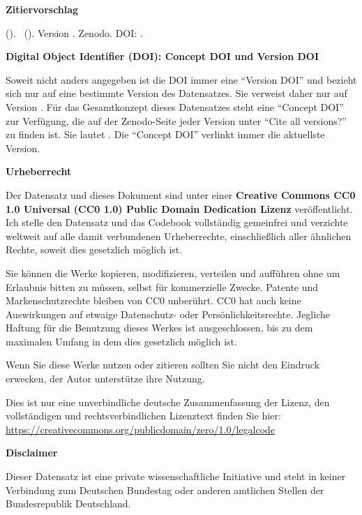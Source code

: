 \textbf{Zitiervorschlag}

\emph{\dataauthor} (\the\year ). \datatitle\ (\datashort ). Version \version . Zenodo. DOI: \dataversiondoi .



\vspace{0.5cm}


\textbf{Digital Object Identifier (DOI): Concept DOI und Version DOI}

Soweit nicht anders angegeben ist die DOI immer eine \enquote{Version DOI} und bezieht sich nur auf eine bestimmte Version des Datensatzes. Sie verweist daher nur auf Version \version . Für das Gesamtkonzept dieses Datensatzes steht eine \enquote{Concept DOI} zur Verfügung, die auf der Zenodo-Seite jeder Version unter \enquote{Cite all versions?} zu finden ist. Sie lautet \dataconceptdoi . Die \enquote{Concept DOI} verlinkt immer die aktuellste Version.


\vspace{0.5cm}


\textbf{Urheberrecht}

Der Datensatz und dieses Dokument sind unter einer \textbf{Creative Commons CC0 1.0 Universal (CC0 1.0) Public Domain Dedication Lizenz} veröffentlicht. Ich stelle den Datensatz und das Codebook vollständig gemeinfrei und verzichte weltweit auf alle damit verbundenen Urheberrechte, einschließlich aller ähnlichen Rechte, soweit dies gesetzlich möglich ist. 

Sie können die Werke kopieren, modifizieren, verteilen und aufführen ohne um Erlaubnis bitten zu müssen, selbst für kommerzielle Zwecke. Patente und Markenschutzrechte bleiben von CC0 unberührt. CC0 hat auch keine Auswirkungen auf etwaige Datenschutz- oder Persönlichkeitsrechte. Jegliche Haftung für die Benutzung dieses Werkes ist ausgeschlossen, bis zu dem maximalen Umfang in dem dies gesetzlich möglich ist. 

Wenn Sie diese Werke nutzen oder zitieren sollten Sie nicht den Eindruck erwecken, der Autor unterstütze ihre Nutzung.

Dies ist nur eine unverbindliche deutsche Zusammenfassung der Lizenz, den vollständigen und rechtsverbindlichen Lizenztext finden Sie hier: \url{https://creativecommons.org/publicdomain/zero/1.0/legalcode}

\vspace{0.5cm}

\textbf{Disclaimer} 

Dieser Datensatz ist eine private wissenschaftliche Initiative und steht in keiner Verbindung zum Deutschen Bundestag oder anderen amtlichen Stellen der Bundesrepublik Deutschland.

\newpage